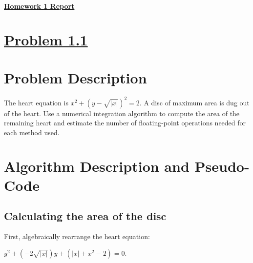 \documentclass[12pt,letterpaper]{article}
\begin{document}
\begin{spacing}{1}

\begin{center}
    \LARGE{\underline{\textbf{Homework 1 Report}}}
\end{center}

\section*{\underline{Problem 1.1}}
\vspace{2em}

\section{Problem Description}
\begin{spacing}{1.2}
The heart equation is $x^2 + (y-\sqrt{|x|})^2=2$. A disc of maximum area is dug out of the heart. Use a numerical integration algorithm to compute the area of the remaining heart and estimate the number of floating-point operations needed for each method used.
\section{Algorithm Description and Pseudo-Code}
\subsection{Calculating the area of the disc}
First, algebraically rearrange the heart equation: 
\begin{mdframed}[backgroundcolor=gray!5]
$y^{2}+(-2\sqrt{\left|x\right|})y+(\left|x\right|+x^{2}-2)=0$. 
\end{mdframed}


\end{spacing}
\end{spacing}
\end{document}
